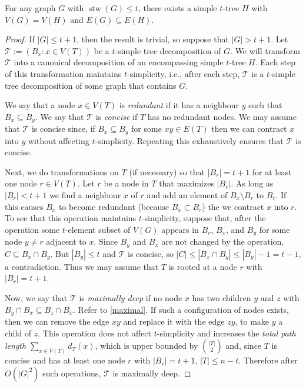 \documentclass[kpfonts]{patmorin}
\DeclareMathOperator{\stw}{stw}
\theoremstyle{named}
\begin{document}
\begin{lem}\label{simple-subgraph}
    For any graph $G$ with $\stw(G)\le t$, there exists a simple $t$-tree $H$ with $V(G)= V(H)$ and $E(G)\subseteq E(H)$.
\end{lem}

\begin{proof}
    If $|G|\le t+1$, then the result is trivial, so suppose that $|G|>t+1$.
    Let $\mathcal{T}:=(B_x:x\in V(T))$ be a $t$-simple tree decomposition of $G$.  We will transform $\mathcal{T}$ into a canonical decomposition of an encompassing simple $t$-tree $H$.  Each step of this transformation maintains $t$-simplicity, i.e., after each step, $\mathcal{T}$ is a $t$-simple tree decomposition of some graph that contains $G$.

    We say that a node $x\in V(T)$ is \emph{redundant} if it has a neighbour $y$ such that $B_x\subseteq B_y$.  We say that $\mathcal{T}$ is \emph{concise} if $T$ has no redundant nodes.  We may assume that $\mathcal{T}$ is concise since,  if $B_x\subseteq B_y$ for some $xy\in E(T)$ then we can contract $x$ into $y$ without affecting $t$-simplicity.  Repeating this exhaustively ensures that $\mathcal{T}$ is concise.

    Next, we do transformations on $T$ (if necessary) so that $|B_r|=t+1$ for at least one node $r\in V(T)$. Let $r$ be a node in $T$ that maximizes $|B_r|$. As long as $|B_r|<t+1$ we find a neighbour $x$ of $r$ and add an element of $B_x\setminus B_r$ to $B_r$.  If this causes $B_x$ to become redundant (because $B_x\subset B_r$) the we contract $x$ into $r$.  To see that this operation maintains $t$-simplicity, suppose that, after the operation some $t$-element subset of $V(G)$ appears in $B_r$, $B_x$, and $B_y$ for some node $y\neq r$ adjacent to $x$.  Since $B_y$ and $B_x$ are not changed by the operation, $C\subseteq B_x\cap B_y$.  But $|B_y|\le t$ and $\mathcal{T}$ is concise, so $|C|\le|B_x\cap B_y|\le|B_y|-1= t-1$, a contradiction. Thus we may assume that $T$ is rooted at a node $r$ with $|B_r|=t+1$.

    Now, we say that $\mathcal{T}$ is \emph{maximally deep} if no node $x$ has two children $y$ and $z$ with $B_y\cap B_x\subseteq B_z\cap B_x$.  Refer to \cref{maximal}.  If such a configuration of nodes exists, then we can remove the edge $xy$ and replace it with the edge $zy$, to make $y$ a child of $z$.  This operation does not affect $t$-simplicity and increases the \emph{total path length} $\sum_{x\in V(T)} d_T(x)$, which is upper bounded by $\binom{|T|}{2}$ and, since $T$ is concise and has at least one node $r$ with $|B_r|=t+1$, $|T|\le n-t$.  Therefore after $O(|G|^2)$ such operations, $\mathcal{T}$ is maximally deep.


\end{proof}
\end{document}
